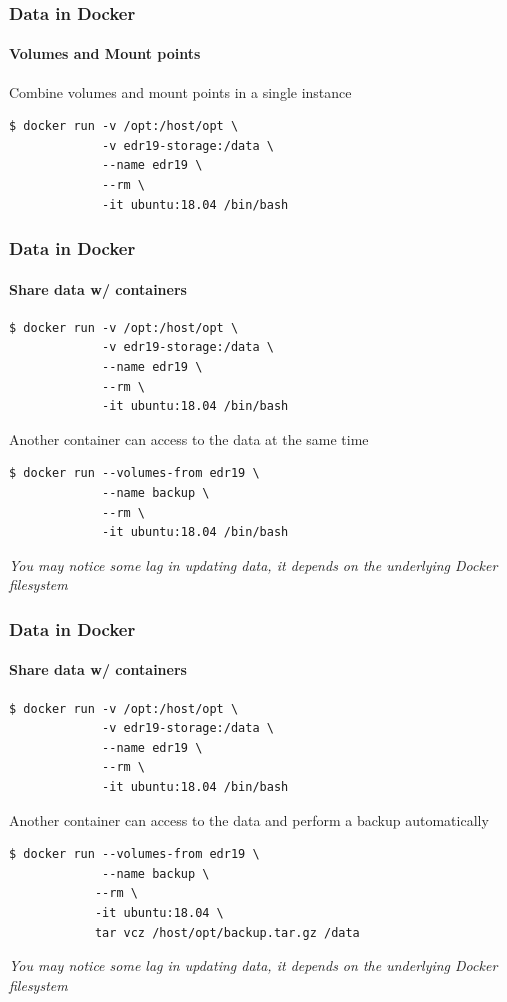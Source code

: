 \begin{frame}[fragile]
\frametitle{Data in Docker}
\framesubtitle{Volumes and Mount points}

Combine volumes and mount points in a single instance

\begin{lstlisting}
$ docker run -v /opt:/host/opt \
             -v edr19-storage:/data \
             --name edr19 \
             --rm \
             -it ubuntu:18.04 /bin/bash
\end{lstlisting}
\end{frame}

\begin{frame}[fragile]
\frametitle{Data in Docker}
\framesubtitle{Share data w/ containers}


\begin{lstlisting}
$ docker run -v /opt:/host/opt \
             -v edr19-storage:/data \
             --name edr19 \
             --rm \
             -it ubuntu:18.04 /bin/bash

\end{lstlisting}
Another container can access to the data at the same time
\begin{lstlisting}
$ docker run --volumes-from edr19 \
             --name backup \
             --rm \
             -it ubuntu:18.04 /bin/bash
\end{lstlisting}
\it{You may notice some lag in updating data, it depends on the underlying Docker filesystem}
\end{frame}

\begin{frame}[fragile]
\frametitle{Data in Docker}
\framesubtitle{Share data w/ containers}

\scriptsize
\begin{lstlisting}
$ docker run -v /opt:/host/opt \
             -v edr19-storage:/data \
             --name edr19 \
             --rm \
             -it ubuntu:18.04 /bin/bash
\end{lstlisting}
\normalsize
Another container can access to the data and perform a backup automatically
\scriptsize
\begin{lstlisting}
$ docker run --volumes-from edr19 \
             --name backup \
            --rm \
            -it ubuntu:18.04 \
            tar vcz /host/opt/backup.tar.gz /data
\end{lstlisting}
\normalsize
\it{You may notice some lag in updating data, it depends on the underlying Docker filesystem}
\end{frame}

